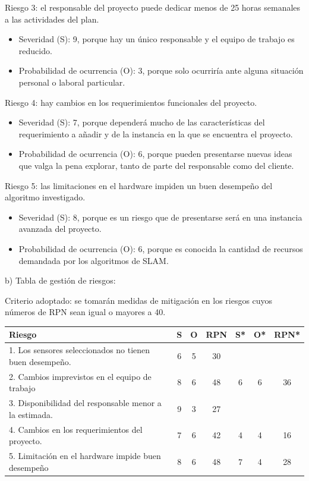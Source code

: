 \documentclass[
11pt, %
codirector, %
]{charter}
\begin{document}
Riesgo 3: el responsable del proyecto puede dedicar menos de 25 horas semanales a las actividades del plan.
\begin{itemize}
	\item Severidad (S): 9, porque hay un único responsable y el equipo de trabajo es reducido.
	\item Probabilidad de ocurrencia (O): 3, porque solo ocurriría ante alguna situación personal o laboral particular.
\end{itemize}

Riesgo 4: hay cambios en los requerimientos funcionales del proyecto.
\begin{itemize}
	\item Severidad (S): 7, porque dependerá mucho de las características del requerimiento a añadir y de la instancia en la que se encuentra el proyecto.
	\item Probabilidad de ocurrencia (O): 6, porque pueden presentarse nuevas ideas que valga la pena explorar, tanto de parte del responsable como del cliente.
\end{itemize}

Riesgo 5: las limitaciones en el hardware impiden un buen desempeño del algoritmo investigado.
\begin{itemize}
	\item Severidad (S): 8, porque es un riesgo que de presentarse será en una instancia avanzada del proyecto.
	\item Probabilidad de ocurrencia (O): 6, porque es conocida la cantidad de recursos demandada por los algoritmos de SLAM.
\end{itemize}

b) Tabla de gestión de riesgos:

Criterio adoptado: se tomarán medidas de mitigación en los riesgos cuyos números de RPN sean igual o mayores a 40.
\begin{table}[htpb]
\centering
\begin{tabularx}{\linewidth}{@{}|X|c|c|c|c|c|c|@{}}
\hline
\rowcolor[HTML]{C0C0C0} 
Riesgo 													& S & O & RPN & S* & O* & RPN*  \\ \hline
1. Los sensores seleccionados no tienen buen desempeño. & 6 & 5 & 30  &   &     &  		\\ \hline
2. Cambios imprevistos en el equipo de trabajo       	& 8 & 6 & 48  & 6 & 6   & 36  	\\ \hline
3. Disponibilidad del responsable menor a la estimada.  & 9 & 3 & 27  &   &     &   	\\ \hline
4. Cambios en los requerimientos del proyecto.     		& 7 & 6 & 42 & 4  & 4   & 16  	\\ \hline
5. Limitación en el hardware impide buen desempeño     	& 8 & 6 & 48 & 7  & 4   & 28  	\\ \hline
\end{tabularx}%
\end{table}
\end{document}
